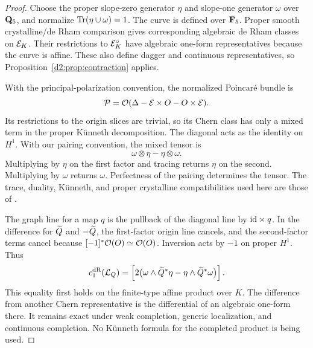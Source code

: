 \begin{proof}
Choose the proper slope-zero generator \(\eta\) and slope-one
generator \(\omega\) over \(\mathbf{Q}_5\), and normalize
\(\operatorname{Tr}(\eta\cup\omega)=1\).
The curve is defined over \(\mathbf{F}_5\).
Proper smooth crystalline/de Rham comparison gives corresponding
algebraic de Rham classes on \(\mathcal E_K\).
Their restrictions to \(\mathcal E_K^\circ\) have algebraic one-form
representatives because the curve is affine.
These also define dagger and continuous representatives, so
Proposition~\ref{d2:prop:contraction} applies.

With the principal-polarization convention, the normalized
Poincar\'e bundle is
\[
 \mathcal P=\mathcal O(\Delta-\mathcal E\times O-O\times\mathcal E).
\]
Its restrictions to the origin slices are trivial, so its Chern
class has only a mixed term in the proper K\"unneth decomposition.
The diagonal acts as the identity on \(H^1\).
With our pairing convention, the mixed tensor is
\[
 \omega\otimes\eta-\eta\otimes\omega.
\]
Multiplying by \(\eta\) on the first factor and tracing returns
\(\eta\) on the second. Multiplying by \(\omega\) returns
\(\omega\). Perfectness of the pairing determines the tensor.
The trace, duality, K\"unneth, and proper crystalline compatibilities
used here are those of \cite[\S1.7(i), \S2.3(i), Theorems~2.4 and~3.2, and \S3.3(i)]{Berthelot1997Duality}.

The graph line for a map \(q\) is the pullback of the diagonal line
by \(\mathrm{id}\times q\).
In the difference for \(\widetilde Q\) and \(-\widetilde Q\), the first-factor
origin line cancels, and the second-factor terms cancel because
\([-1]^*\mathcal O(O)\simeq\mathcal O(O)\).
Inversion acts by \(-1\) on proper \(H^1\).
Thus
\begin{equation}\label{d2:eq:graph-class}
 c_1^{\mathrm{dR}}(\mathcal L_Q)
 =
 \left[2\bigl(\omega\wedge\widetilde Q^*\eta
             -\eta\wedge\widetilde Q^*\omega\bigr)\right].
\end{equation}
This equality first holds on the finite-type affine product over
\(K\). The difference from another Chern representative is the
differential of an algebraic one-form there.
It remains exact under weak completion, generic localization, and
continuous completion. No K\"unneth formula for the completed
product is being used.


\end{proof}
